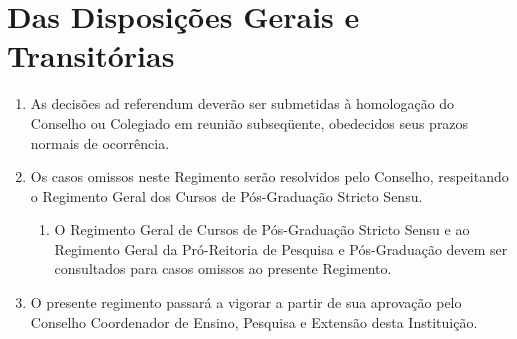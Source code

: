 \documentclass{article}
\newcommand{\singleitem}{\item[Parágrafo Único.]}
\newcommand{\grupoMenor}{Colegiado\xspace}
\newcommand{\grupoMaior}{Conselho\xspace}
\begin{document}
\section{Das Disposições Gerais e Transitórias}

\begin{enumerate}
	\item As decisões ad referendum deverão ser submetidas à homologação do \grupoMaior ou \grupoMenor em reunião subseqüente, obedecidos seus prazos normais de ocorrência.

	\item Os casos omissos neste Regimento serão resolvidos pelo \grupoMaior, respeitando o Regimento Geral dos Cursos de Pós-Graduação Stricto Sensu.
	\begin{enumerate}
		\singleitem O Regimento Geral de Cursos de Pós-Graduação Stricto Sensu e ao Regimento Geral da Pró-Reitoria de Pesquisa e Pós-Graduação devem ser consultados para casos omissos ao presente Regimento. 
	\end{enumerate}

	\item  O presente regimento passará a vigorar a partir de sua aprovação pelo Conselho Coordenador de Ensino, Pesquisa e Extensão desta Instituição.

\end{enumerate}
\end{document}
